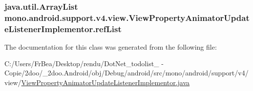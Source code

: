 \hypertarget{classmono_1_1android_1_1support_1_1v4_1_1view_1_1_view_property_animator_update_listener_implementor_e0c31acb2dbcdd25358b4a588fbb3995}{
\subsubsection[{refList}]{\setlength{\rightskip}{0pt plus 5cm}java.util.ArrayList {\bf mono.android.support.v4.view.ViewPropertyAnimatorUpdateListenerImplementor.refList}}}
\label{classmono_1_1android_1_1support_1_1v4_1_1view_1_1_view_property_animator_update_listener_implementor_e0c31acb2dbcdd25358b4a588fbb3995}




The documentation for this class was generated from the following file:\begin{CompactItemize}
\item 
C:/Users/FrBea/Desktop/rendu/DotNet\_\-todolist\_ - Copie/2doo/\_\-2doo.Android/obj/Debug/android/src/mono/android/support/v4/view/\hyperlink{_view_property_animator_update_listener_implementor_8java}{ViewPropertyAnimatorUpdateListenerImplementor.java}\end{CompactItemize}
